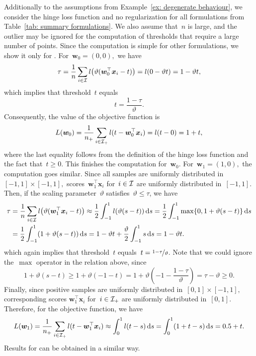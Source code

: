 Additionally to the assumptions from Example~\ref{ex: degenerate behaviour}, we consider the hinge loss function and no regularization for all formulations from Table~\ref{tab: summary formulations}. We also assume that~$n$ is large, and the outlier may be ignored for the computation of thresholds that require a large number of points. Since the computation is simple for other formulations, we show it only for \PatMat. For~$\bm{w}_0 = (0,0),$ we have
\begin{equation*}
  \tau
  = \frac{1}{n}\sum_{i \in \I} l\Brac{\vartheta(\bm{w}_0^\top \bm{x}_i - t)}
  = l(0 - \vartheta t) = 1 - \vartheta t,
\end{equation*}
which implies that threshold~$t$ equals
\begin{equation}\label{eq: PatMat threshold 0}
  t = \frac{1-\tau}{\vartheta}.
\end{equation}
Consequently, the value of the objective function is
\begin{equation}\label{eq: PatMat objective 0}
  L(\bm{w}_0)
    = \frac{1}{n_{+}} \sum_{i \in \mathcal{I}_{+}} l(t - \bm{w}_0^\top \bm{x}_i)
    = l(t - 0)
    = 1 + t,
\end{equation}
where the last equality follows from the definition of the hinge loss function and the fact that~$t \geq 0.$ This finishes the computation for~$\bm{w}_0$. For~$\bm{w}_1 = (1,0),$ the computation goes similar. Since all samples are uniformly distributed in~$[-1,1]\times[-1,1],$ scores~$\bm{w}_1^\top \bm{x}_i$ for~$i \in \mathcal{I}$ are uniformly distributed in~$[-1,1].$ Then, if the scaling parameter~$\vartheta$ satisfies~$\vartheta \leq \tau$, we have
\begin{align*}
  \tau
    & = \frac{1}{n} \sum_{i \in \I} l\Brac{\vartheta (\bm{w}_1^\top \bm{x}_i - t)}
    \approx \frac{1}{2}\int_{-1}^{1} l\Brac{\vartheta(s-t)} \dd{s}
      = \frac{1}{2} \int_{-1}^{1} \max\{0, 1 + \vartheta(s - t)\}\dd{s} \\
    & =\frac{1}{2} \int_{-1}^{1} (1+\vartheta(s - t))\dd{s}
      = 1 - \vartheta t + \frac{\vartheta}{2}\int_{-1}^{1}s\dd{s}
      = 1 - \vartheta t.
\end{align*}
which again implies that threshold~$t$ equals~$t = \nicefrac{1-\tau}{\vartheta}$. Note that we could ignore the~$\max$ operator in the relation above, since 
\begin{equation*}
  1 + \vartheta(s - t)
    \geq 1 + \vartheta(-1 - t)
    = 1 + \vartheta(-1 - \frac{1 - \tau}{\vartheta})
    = \tau - \vartheta
    \geq 0.
\end{equation*}
Finally, since positive samples are uniformly distributed in~$[0,1]\times[-1,1],$ corresponding scores $\bm{w}_1^\top \bm{x}_i$  for~$i \in \mathcal{I}_{+}$ are uniformly distributed in~$[0,1].$ Therefore, for the objective function, we have
\begin{equation*}
  L(\bm{w}_1)
    = \frac{1}{n_{+}} \sum_{i \in \mathcal{I}_{+}} l(t - \bm{w}_1^\top \bm{x}_i)
    \approx \int_{0}^{1} l(t-s)\mathop{}\!\mathrm{d}s
    = \int_{0}^{1} (1 + t - s)\mathop{}\!\mathrm{d}s
    = 0.5 + t.
\end{equation*}
Results for \PatMatNP can be obtained in a similar way.

